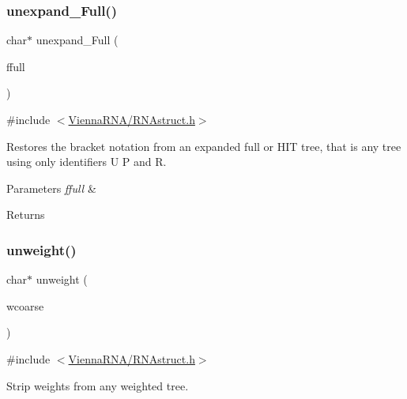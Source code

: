 \subsubsection{\texorpdfstring{unexpand\+\_\+\+Full()}{unexpand\_Full()}}
{\footnotesize\ttfamily char$\ast$ unexpand\+\_\+\+Full (\begin{DoxyParamCaption}\item[{const char $\ast$}]{ffull }\end{DoxyParamCaption})}



{\ttfamily \#include $<$\mbox{\hyperlink{_r_n_astruct_8h}{Vienna\+R\+N\+A/\+R\+N\+Astruct.\+h}}$>$}



Restores the bracket notation from an expanded full or H\+IT tree, that is any tree using only identifiers \textquotesingle{}U\textquotesingle{} \textquotesingle{}P\textquotesingle{} and \textquotesingle{}R\textquotesingle{}. 


\begin{DoxyParams}{Parameters}
{\em ffull} & \\
\hline
\end{DoxyParams}
\begin{DoxyReturn}{Returns}

\end{DoxyReturn}
\mbox{\label{group__struct__utils_ga09a80253ac7b6bae606871ba7c6e5136}} 
\subsubsection{\texorpdfstring{unweight()}{unweight()}}
{\footnotesize\ttfamily char$\ast$ unweight (\begin{DoxyParamCaption}\item[{const char $\ast$}]{wcoarse }\end{DoxyParamCaption})}



{\ttfamily \#include $<$\mbox{\hyperlink{_r_n_astruct_8h}{Vienna\+R\+N\+A/\+R\+N\+Astruct.\+h}}$>$}



Strip weights from any weighted tree. 


